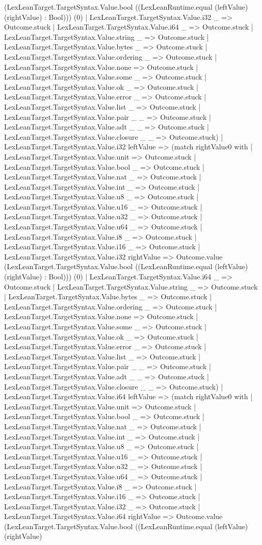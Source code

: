 \documentclass[11pt]{article}
\begin{document}
(LexLeanTarget.TargetSyntax.Value.bool ((LexLeanRuntime.equal (leftValue) (rightValue) : Bool))) (0) | LexLeanTarget.TargetSyntax.Value.i32 \_ => Outcome.stuck | LexLeanTarget.TargetSyntax.Value.i64 \_ => Outcome.stuck | LexLeanTarget.TargetSyntax.Value.string \_ => Outcome.stuck | LexLeanTarget.TargetSyntax.Value.bytes \_ => Outcome.stuck | LexLeanTarget.TargetSyntax.Value.ordering \_ => Outcome.stuck | LexLeanTarget.TargetSyntax.Value.none => Outcome.stuck | LexLeanTarget.TargetSyntax.Value.some \_ => Outcome.stuck | LexLeanTarget.TargetSyntax.Value.ok \_ => Outcome.stuck | LexLeanTarget.TargetSyntax.Value.error \_ => Outcome.stuck | LexLeanTarget.TargetSyntax.Value.list \_ => Outcome.stuck | LexLeanTarget.TargetSyntax.Value.pair \_ \_ => Outcome.stuck | LexLeanTarget.TargetSyntax.Value.adt \_ \_ => Outcome.stuck | LexLeanTarget.TargetSyntax.Value.closure \_ \_ => Outcome.stuck) | LexLeanTarget.TargetSyntax.Value.i32 leftValue => (match rightValue0 with | LexLeanTarget.TargetSyntax.Value.unit => Outcome.stuck | LexLeanTarget.TargetSyntax.Value.bool \_ => Outcome.stuck | LexLeanTarget.TargetSyntax.Value.nat \_ => Outcome.stuck | LexLeanTarget.TargetSyntax.Value.int \_ => Outcome.stuck | LexLeanTarget.TargetSyntax.Value.u8 \_ => Outcome.stuck | LexLeanTarget.TargetSyntax.Value.u16 \_ => Outcome.stuck | LexLeanTarget.TargetSyntax.Value.u32 \_ => Outcome.stuck | LexLeanTarget.TargetSyntax.Value.u64 \_ => Outcome.stuck | LexLeanTarget.TargetSyntax.Value.i8 \_ => Outcome.stuck | LexLeanTarget.TargetSyntax.Value.i16 \_ => Outcome.stuck | LexLeanTarget.TargetSyntax.Value.i32 rightValue => Outcome.value (LexLeanTarget.TargetSyntax.Value.bool ((LexLeanRuntime.equal (leftValue) (rightValue) : Bool))) (0) | LexLeanTarget.TargetSyntax.Value.i64 \_ => Outcome.stuck | LexLeanTarget.TargetSyntax.Value.string \_ => Outcome.stuck | LexLeanTarget.TargetSyntax.Value.bytes \_ => Outcome.stuck | LexLeanTarget.TargetSyntax.Value.ordering \_ => Outcome.stuck | LexLeanTarget.TargetSyntax.Value.none => Outcome.stuck | LexLeanTarget.TargetSyntax.Value.some \_ => Outcome.stuck | LexLeanTarget.TargetSyntax.Value.ok \_ => Outcome.stuck | LexLeanTarget.TargetSyntax.Value.error \_ => Outcome.stuck | LexLeanTarget.TargetSyntax.Value.list \_ => Outcome.stuck | LexLeanTarget.TargetSyntax.Value.pair \_ \_ => Outcome.stuck | LexLeanTarget.TargetSyntax.Value.adt \_ \_ => Outcome.stuck | LexLeanTarget.TargetSyntax.Value.closure \_ \_ => Outcome.stuck) | LexLeanTarget.TargetSyntax.Value.i64 leftValue => (match rightValue0 with | LexLeanTarget.TargetSyntax.Value.unit => Outcome.stuck | LexLeanTarget.TargetSyntax.Value.bool \_ => Outcome.stuck | LexLeanTarget.TargetSyntax.Value.nat \_ => Outcome.stuck | LexLeanTarget.TargetSyntax.Value.int \_ => Outcome.stuck | LexLeanTarget.TargetSyntax.Value.u8 \_ => Outcome.stuck | LexLeanTarget.TargetSyntax.Value.u16 \_ => Outcome.stuck | LexLeanTarget.TargetSyntax.Value.u32 \_ => Outcome.stuck | LexLeanTarget.TargetSyntax.Value.u64 \_ => Outcome.stuck | LexLeanTarget.TargetSyntax.Value.i8 \_ => Outcome.stuck | LexLeanTarget.TargetSyntax.Value.i16 \_ => Outcome.stuck | LexLeanTarget.TargetSyntax.Value.i32 \_ => Outcome.stuck | LexLeanTarget.TargetSyntax.Value.i64 rightValue => Outcome.value (LexLeanTarget.TargetSyntax.Value.bool ((LexLeanRuntime.equal (leftValue) (rightValue) 
\end{document}
